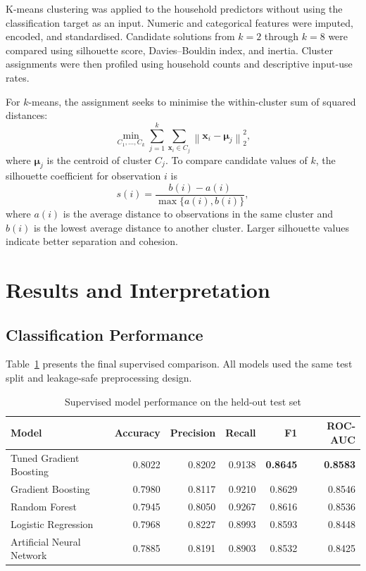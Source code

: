 \documentclass[12pt,a4paper]{article}
\begin{document}
K-means clustering was applied to the household predictors without using the classification target as an input. Numeric and categorical features were imputed, encoded, and standardised. Candidate solutions from $k=2$ through $k=8$ were compared using silhouette score, Davies--Bouldin index, and inertia. Cluster assignments were then profiled using household counts and descriptive input-use rates.

For $k$-means, the assignment seeks to minimise the within-cluster sum of squared distances:
\[
\min_{C_1,\ldots,C_k}\sum_{j=1}^{k}\sum_{\mathbf{x}_i\in C_j}
\left\lVert\mathbf{x}_i-\boldsymbol{\mu}_j\right\rVert_2^2,
\]
where $\boldsymbol{\mu}_j$ is the centroid of cluster $C_j$. To compare candidate values of $k$, the silhouette coefficient for observation $i$ is
\[
s(i)=\frac{b(i)-a(i)}{\max\{a(i),b(i)\}},
\]
where $a(i)$ is the average distance to observations in the same cluster and $b(i)$ is the lowest average distance to another cluster. Larger silhouette values indicate better separation and cohesion.

\section{Results and Interpretation}

\subsection{Classification Performance}

Table~\ref{tab:model-comparison} presents the final supervised comparison. All models used the same test split and leakage-safe preprocessing design.

\begin{table}[H]
\centering
\caption{Supervised model performance on the held-out test set}
\label{tab:model-comparison}
\begin{tabular}{lrrrrr}
\toprule
\textbf{Model} & \textbf{Accuracy} & \textbf{Precision} & \textbf{Recall} & \textbf{F1} & \textbf{ROC-AUC} \\
\midrule
Tuned Gradient Boosting & 0.8022 & 0.8202 & 0.9138 & \textbf{0.8645} & \textbf{0.8583} \\
Gradient Boosting & 0.7980 & 0.8117 & 0.9210 & 0.8629 & 0.8546 \\
Random Forest & 0.7945 & 0.8050 & 0.9267 & 0.8616 & 0.8536 \\
Logistic Regression & 0.7968 & 0.8227 & 0.8993 & 0.8593 & 0.8448 \\
Artificial Neural Network & 0.7885 & 0.8191 & 0.8903 & 0.8532 & 0.8425 \\
\bottomrule
\end{tabular}
\end{table}
\end{document}
